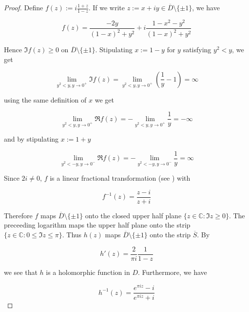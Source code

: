 \begin{proof}
	Define $\displaystyle f(z) := i\frac{1 + z}{1 - z}$. If we write $z := x + iy \in \overline{D} \setminus \{\pm 1\}$, we have 

	\begin{equation}
		f(z) = \frac{-2y}{(1 - x)^2 + y^2} + i \frac{1 - x^2 - y^2}{(1 - x)^2 + y^2}
		\label{eq:rep_lft}
	\end{equation}

	Hence $\Im f(z) \geqslant 0$ on $\overline{D}\setminus \{\pm 1\}$. Stipulating $x := 1 - y$ for $y$ satisfying $y^2 < y$, we get

	\begin{equation*}
		\lim\limits_{y^2 < y, y \rightarrow 0^+} \Im f(z) = \lim\limits_{y^2 < y, y \rightarrow 0^+} \left( \frac{1}{y} - 1 \right) = \infty
	\end{equation*}

	using the same definition of $x$ we get

	\begin{equation*}
		\lim\limits_{y^2 < y, y \rightarrow 0^+} \Re f(z) = -\lim\limits_{y^2 < y, y \rightarrow 0^+} \frac{1}{y} = -\infty
	\end{equation*}

	and by stipulating $x := 1 + y$

	\begin{equation*}
		\lim\limits_{y^2 < -y, y \rightarrow 0^-} \Re f(z) = -\lim\limits_{y^2 < -y, y \rightarrow 0^-} \frac{1}{y} = \infty	
	\end{equation*}


	Since $2i \neq 0$, $f$ is a linear fractional transformation (see \cite[279]{rudin:rc_analysis:1987}) with

	\begin{equation*}
		f^{-1}(z) = \frac{z - i}{z + i}
	\end{equation*}

	Therefore $f$ maps $\overline{D}\setminus \{\pm 1\}$ onto the closed upper half plane $\{z \in \mathbb{C} : \Im z \geqslant 0\}$. The preceeding logarithm maps the upper half plane onto the strip $\{z \in \mathbb{C} : 0 \leqslant \Im z \leqslant \pi \}$. Thus $h(z)$ maps $\overline{D}\setminus \{\pm 1\}$ onto the strip $\overline{S}$. By

\begin{equation}
	h'(z) = \frac{2}{\pi i} \frac{1}{1 - z}
	\label{eq:h_diff}
\end{equation}

	we see that $h$ is a holomorphic function in $D$. Furthermore, we have

	\begin{equation*}
		h^{-1}(z) = \frac{e^{\pi iz} - i}{e^{\pi i z} + i}
	\end{equation*}
\end{proof}


